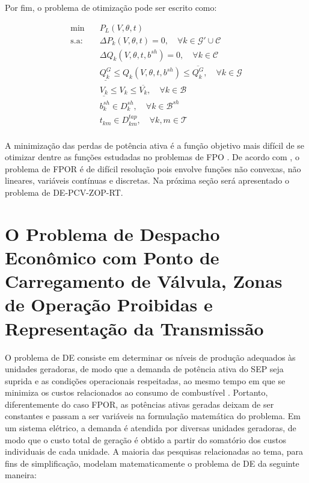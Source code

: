 \documentclass[
	12pt,				%
	openany,			%
	twoside,			%
	a4paper,			%
	chapter=TITLE,		%
	section=Title,		%
	subsection=Title,	%
	subsubsection=Title,%
	english,			%
	french,				%
	spanish,			%
	brazil			%
	]{abntex2}
\begin{document}
\begin{ERRATA}
Por fim, o problema de otimização pode ser escrito como:


\begin{equation} \label{FPOR}
\begin{aligned}
\text{min}  &\quad P_L(V,\theta,t)  \\
\text{s.a:} &\quad   \Delta P_k(V,\theta,t) = 0, \quad \forall k \in \mathcal{G}' \cup \mathcal{C} \\
&\quad   \Delta Q_k(V,\theta,t, b^{sh}) = 0, \quad \forall k \in \mathcal{C} \quad\\
&\quad \underline{Q^{G}_{k}} \leq Q_{k}(V,\theta,t,b^{sh}) \leq \overline{Q^{G}_{k}}, \quad  \forall k \in \mathcal{G}\\
&\quad \underline{V_{k}} \leq V_{k} \leq \overline{V_{k}}, \quad  \forall k \in \mathcal{B}\\
&\quad b^{sh}_{k} \in D_{k}^{sh}, \quad \forall k \in \mathcal{B}^{sh}\\
&\quad t_{km} \in D_{km}^{tap},\quad \forall k,m \in \mathcal{T} \\
\end{aligned}
\end{equation}

A minimização das perdas de potência ativa é a função objetivo mais difícil de se otimizar dentre as funções estudadas no problemas de FPO \cite{monti}. De acordo com , o problema de FPOR é de difícil resolução pois envolve funções não convexas, não lineares, variáveis contínuas e discretas. Na próxima seção será apresentado o problema de DE-PCV-ZOP-RT.


\section{O Problema de Despacho Econômico com Ponto de Carregamento de Válvula, Zonas de Operação Proibidas e Representação da Transmissão}

O problema de DE consiste em determinar os níveis de produção adequados às unidades
geradoras, de modo que a demanda de potência ativa do SEP seja suprida e as condições operacionais respeitadas, ao mesmo tempo em que se minimiza os custos relacionados ao consumo de combustível \cite{psohibrido}. Portanto, diferentemente do caso FPOR, as potências ativas geradas deixam de ser constantes e passam a ser variáveis na formulação matemática do problema. Em um sistema elétrico, a demanda é atendida por diversas unidades geradoras, de modo que o custo total de geração é obtido a partir do somatório dos custos individuais de cada unidade. A maioria das pesquisas relacionadas ao tema, para fins de simplificação, 
modelam matematicamente o problema de DE da seguinte maneira:



\end{ERRATA}
\end{document}
